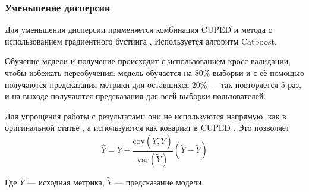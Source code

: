 \documentclass[../document.tex]{subfiles}
\begin{document}
	\subsubsection{Уменьшение дисперсии}
	\par Для уменьшения дисперсии применяется комбинация \cite{reducing_variance} CUPED \cite{cuped} и метода с использованием градиентного бустинга \cite{boosting_ab}. Используется алгоритм Catboost.
	\par Обучение модели и получение происходит с использованием кросс-валидации, чтобы избежать переобучения: модель обучается на 80\% выборки и с её помощью получаются предсказания метрики для оставшихся 20\% --- так повторяется 5 раз, и на выходе получаются предсказания для всей выборки пользователей.
	\par Для упрощения работы с результатами они не используются напрямую, как в оригинальной статье \cite{boosting_ab}, а используются как ковариат в CUPED \cite{cuped}. Это позволяет 
	\begin{equation}
		\hat{Y}=Y-\frac{\text{cov}(Y,\tilde{Y})}{\text{var}(\tilde{Y})}(\tilde{Y}-\overline{\tilde{Y}})
	\end{equation}
	\par Где $Y$ --- исходная метрика, $\tilde{Y}$ --- предсказание модели.
\end{document}
